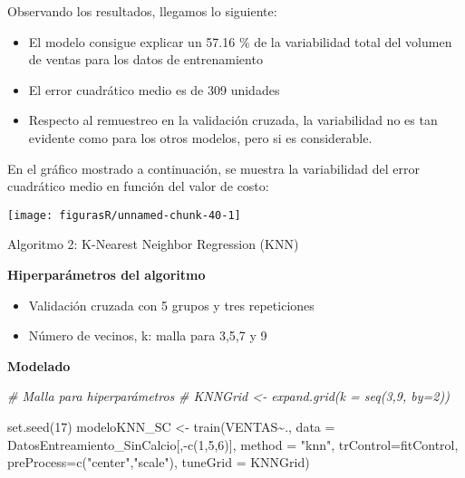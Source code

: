 \documentclass[
]{article}
\newenvironment{Shaded}{\begin{snugshade}}{\end{snugshade}}
\newcommand{\AttributeTok}[1]{\textcolor[rgb]{0.77,0.63,0.00}{#1}}
\newcommand{\CommentTok}[1]{\textcolor[rgb]{0.56,0.35,0.01}{\textit{#1}}}
\newcommand{\DecValTok}[1]{\textcolor[rgb]{0.00,0.00,0.81}{#1}}
\newcommand{\FunctionTok}[1]{\textcolor[rgb]{0.00,0.00,0.00}{#1}}
\newcommand{\NormalTok}[1]{#1}
\newcommand{\OtherTok}[1]{\textcolor[rgb]{0.56,0.35,0.01}{#1}}
\newcommand{\SpecialCharTok}[1]{\textcolor[rgb]{0.00,0.00,0.00}{#1}}
\newcommand{\StringTok}[1]{\textcolor[rgb]{0.31,0.60,0.02}{#1}}
\providecommand{\tightlist}{%
  \setlength{\itemsep}{0pt}\setlength{\parskip}{0pt}}
\begin{document}
Observando los resultados, llegamos lo siguiente:

\begin{itemize}
\tightlist
\item
  El modelo consigue explicar un 57.16 \% de la variabilidad total del
  volumen de ventas para los datos de entrenamiento
\item
  El error cuadrático medio es de 309 unidades
\item
  Respecto al remuestreo en la validación cruzada, la variabilidad no es
  tan evidente como para los otros modelos, pero si es considerable.
\end{itemize}

En el gráfico mostrado a continuación, se muestra la variabilidad del
error cuadrático medio en función del valor de costo:

\begin{center}\texttt{[image: figurasR/unnamed-chunk-40-1]} \end{center}

Algoritmo 2: K-Nearest Neighbor Regression (KNN)

\textbf{Hiperparámetros del algoritmo}

\begin{itemize}
\tightlist
\item
  Validación cruzada con 5 grupos y tres repeticiones
\item
  Número de vecinos, k: malla para 3,5,7 y 9
\end{itemize}

\textbf{Modelado}

\begin{Shaded}
\begin{Highlighting}[]
\CommentTok{\# Malla para hiperparámetros}
\CommentTok{\# KNNGrid \textless{}{-}  expand.grid(k = seq(3,9, by=2))}

\FunctionTok{set.seed}\NormalTok{(}\DecValTok{17}\NormalTok{)}
\NormalTok{modeloKNN\_SC }\OtherTok{\textless{}{-}} \FunctionTok{train}\NormalTok{(VENTAS}\SpecialCharTok{\textasciitilde{}}\NormalTok{., }
                \AttributeTok{data =}\NormalTok{ DatosEntreamiento\_SinCalcio[,}\SpecialCharTok{{-}}\FunctionTok{c}\NormalTok{(}\DecValTok{1}\NormalTok{,}\DecValTok{5}\NormalTok{,}\DecValTok{6}\NormalTok{)], }
                \AttributeTok{method =} \StringTok{"knn"}\NormalTok{, }
                \AttributeTok{trControl=}\NormalTok{fitControl, }
                \AttributeTok{preProcess=}\FunctionTok{c}\NormalTok{(}\StringTok{"center"}\NormalTok{,}\StringTok{"scale"}\NormalTok{),}
                \AttributeTok{tuneGrid =}\NormalTok{ KNNGrid)}
\end{Highlighting}
\end{Shaded}
\end{document}

